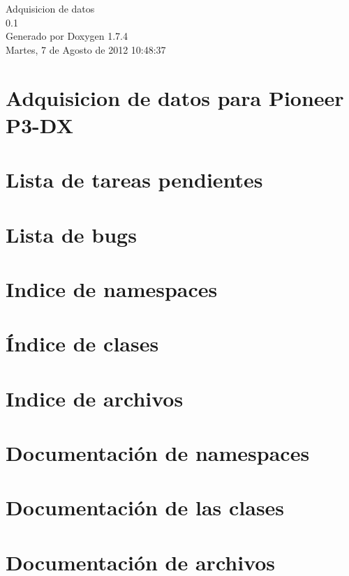 \documentclass[a4paper]{book}
\begin{document}
\hypersetup{pageanchor=false}
\begin{titlepage}
\vspace*{7cm}
\begin{center}
{\Large Adquisicion de datos \\[1ex]\large 0.1 }\\
\vspace*{1cm}
{\large Generado por Doxygen 1.7.4}\\
\vspace*{0.5cm}
{\small Martes, 7 de Agosto de 2012 10:48:37}\\
\end{center}
\end{titlepage}
\clearemptydoublepage
{}
\tableofcontents
\clearemptydoublepage
{}
\hypersetup{pageanchor=true}
\chapter{Adquisicion de datos para Pioneer P3-\/DX}
\label{index}\hypertarget{index}{}
\chapter{Lista de tareas pendientes}
\label{todo}
\hypertarget{todo}{}

\chapter{Lista de bugs}
\label{bug}
\hypertarget{bug}{}

\chapter{Indice de namespaces}

\chapter{Índice de clases}

\chapter{Indice de archivos}

\chapter{Documentación de namespaces}




\chapter{Documentación de las clases}




\chapter{Documentación de archivos}





\printindex
\end{document}
